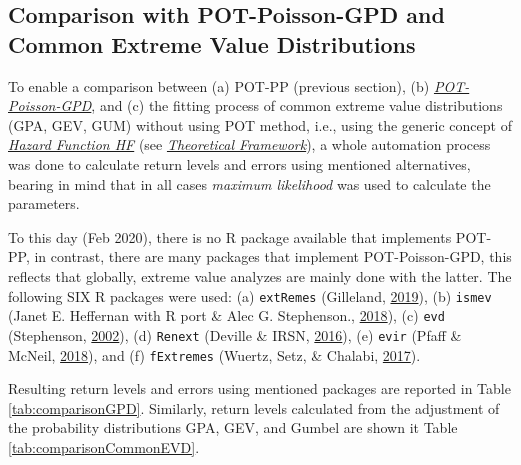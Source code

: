 \documentclass[12pt,oneside]{reedthesis}
\begin{document}
\hypertarget{comparison-with-pot-poisson-gpd-and-common-extreme-value-distributions}{%
\subsection{Comparison with POT-Poisson-GPD and Common Extreme Value Distributions}\label{comparison-with-pot-poisson-gpd-and-common-extreme-value-distributions}}

To enable a comparison between (a) POT-PP (previous section), (b) \emph{\protect\hyperlink{pot-poisson-gpd}{POT-Poisson-GPD}}, and (c) the fitting process of common extreme value distributions (GPA, GEV, GUM) without using POT method, i.e., using the generic concept of \emph{\protect\hyperlink{hf}{Hazard Function HF}} (see \emph{\protect\hyperlink{rmd-thefra}{Theoretical Framework}}), a whole automation process was done to calculate return levels and errors using mentioned alternatives, bearing in mind that in all cases \emph{maximum likelihood} was used to calculate the parameters.

To this day (Feb 2020), there is no R package available that implements POT-PP, in contrast, there are many packages that implement POT-Poisson-GPD, this reflects that globally, extreme value analyzes are mainly done with the latter. The following SIX R packages were used: (a) \texttt{extRemes} (Gilleland, \protect\hyperlink{ref-Gilleland2019}{2019}), (b) \texttt{ismev} (Janet E. Heffernan with R port \& Alec G. Stephenson., \protect\hyperlink{ref-JanetE.HeffernanwithRport2018}{2018}), (c) \texttt{evd} (Stephenson, \protect\hyperlink{ref-Stephenson2002}{2002}), (d) \texttt{Renext} (Deville \& IRSN, \protect\hyperlink{ref-Deville2016}{2016}), (e) \texttt{evir} (Pfaff \& McNeil, \protect\hyperlink{ref-Pfaff2018}{2018}), and (f) \texttt{fExtremes} (Wuertz, Setz, \& Chalabi, \protect\hyperlink{ref-Wuertz2017}{2017}).

Resulting return levels and errors using mentioned packages are reported in Table \ref{tab:comparisonGPD}. Similarly, return levels calculated from the adjustment of the probability distributions GPA, GEV, and Gumbel are shown it Table \ref{tab:comparisonCommonEVD}.
\end{document}
